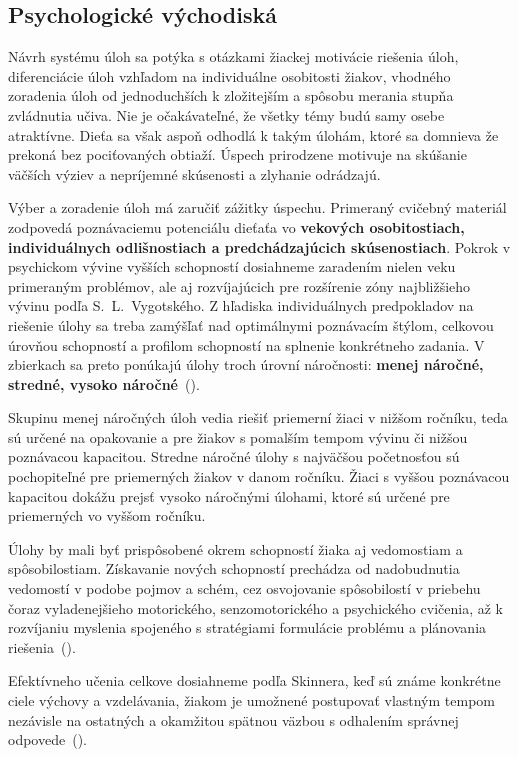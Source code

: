 \subsection{Psychologické východiská}
Návrh systému úloh sa potýka s otázkami žiackej motivácie riešenia úloh, diferenciácie úloh vzhľadom na individuálne osobitosti žiakov, vhodného zoradenia úloh od jednoduchších k zložitejším a spôsobu merania stupňa zvládnutia učiva. Nie je očakávateľné, že všetky témy budú samy osebe atraktívne. Dieťa sa však aspoň odhodlá k takým úlohám, ktoré sa domnieva že prekoná bez pociťovaných obtiaží. Úspech prirodzene motivuje na skúšanie väčších výziev a nepríjemné skúsenosti a zlyhanie odrádzajú. 

Výber a zoradenie úloh má zaručiť zážitky úspechu. Primeraný cvičebný materiál zodpovedá poznávaciemu potenciálu dieťaťa vo \textbf{vekových osobitostiach, individuálnych odlišnostiach a predchádzajúcich skúsenostiach}. Pokrok v psychickom vývine vyšších schopností dosiahneme zaradením nielen veku primeraným problémov, ale aj rozvíjajúcich pre rozšírenie zóny najbližšieho vývinu podľa S.~L.~Vygotského. Z hľadiska individuálnych predpokladov na riešenie úlohy sa treba zamýšľať nad optimálnymi poznávacím štýlom, celkovou úrovňou schopností a profilom schopností na splnenie konkrétneho zadania. V zbierkach sa preto ponúkajú úlohy troch úrovní náročnosti: \textbf{menej náročné, stredné, vysoko náročné}~(\cite{pavlovkin_ziak_1989}).
 
Skupinu menej náročných úloh vedia riešiť priemerní žiaci v nižšom ročníku, teda sú určené na opakovanie a pre žiakov s pomalším tempom vývinu či nižšou poznávacou kapacitou. Stredne náročné úlohy s najväčšou početnosťou sú pochopiteľné pre priemerných žiakov v danom ročníku. Žiaci s vyššou poznávacou kapacitou dokážu prejsť vysoko náročnými úlohami, ktoré sú určené pre priemerných vo vyššom ročníku.
 
Úlohy by mali byť prispôsobené okrem schopností žiaka aj vedomostiam a spôsobilostiam. Získavanie nových schopností prechádza od nadobudnutia vedomostí v podobe pojmov a schém, cez osvojovanie spôsobilostí v priebehu čoraz vyladenejšieho motorického, senzomotorického a psychického cvičenia, až k rozvíjaniu myslenia spojeného s stratégiami formulácie problému a plánovania riešenia~(\cite{pavlovkin_ziak_1989}).

Efektívneho učenia celkove dosiahneme podľa Skinnera, keď sú známe konkrétne ciele výchovy a vzdelávania, žiakom je umožnené postupovať vlastným tempom nezávisle na ostatných a okamžitou spätnou väzbou s odhalením správnej odpovede~(\cite{pavlovkin_ziak_1989}).


